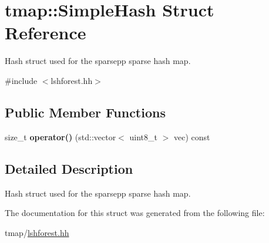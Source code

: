 \hypertarget{structtmap_1_1SimpleHash}{}\section{tmap\+:\+:Simple\+Hash Struct Reference}
\label{structtmap_1_1SimpleHash}


Hash struct used for the sparsepp sparse hash map.  




{\ttfamily \#include $<$lshforest.\+hh$>$}

\subsection*{Public Member Functions}
\begin{DoxyCompactItemize}
\item 
\mbox{\label{structtmap_1_1SimpleHash_a2246e182ae49e4ff363d6c3344aa97cf}} 
size\+\_\+t {\bfseries operator()} (std\+::vector$<$ uint8\+\_\+t $>$ vec) const
\end{DoxyCompactItemize}


\subsection{Detailed Description}
Hash struct used for the sparsepp sparse hash map. 

The documentation for this struct was generated from the following file\+:\begin{DoxyCompactItemize}
\item 
tmap/\hyperlink{lshforest_8hh}{lshforest.\+hh}\end{DoxyCompactItemize}
